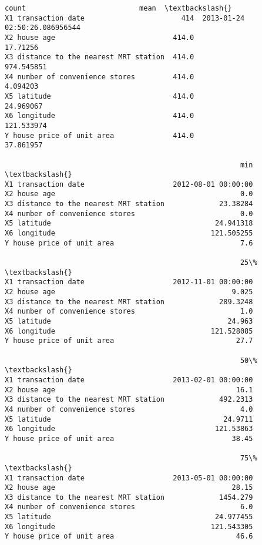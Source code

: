 \documentclass[11pt]{article}
\makeatletter
\newcommand{\boxspacing}{\kern\kvtcb@left@rule\kern\kvtcb@boxsep}
\newcommand{\prompt}[4]{
        {\ttfamily\llap{{\color{#2}[#3]:\hspace{3pt}#4}}\vspace{-\baselineskip}}
    }
\makeatother
\begin{document}
            \begin{tcolorbox}[breakable, size=fbox, boxrule=.5pt, pad at break*=1mm, opacityfill=0]
\prompt{Out}{outcolor}{221}{\boxspacing}
\begin{Verbatim}[commandchars=\\\{\}]
                                        count                           mean  \textbackslash{}
X1 transaction date                       414  2013-01-24 02:50:26.086956544
X2 house age                            414.0                       17.71256
X3 distance to the nearest MRT station  414.0                     974.545851
X4 number of convenience stores         414.0                       4.094203
X5 latitude                             414.0                      24.969067
X6 longitude                            414.0                     121.533974
Y house price of unit area              414.0                      37.861957

                                                        min  \textbackslash{}
X1 transaction date                     2012-08-01 00:00:00
X2 house age                                            0.0
X3 distance to the nearest MRT station             23.38284
X4 number of convenience stores                         0.0
X5 latitude                                       24.941318
X6 longitude                                     121.505255
Y house price of unit area                              7.6

                                                        25\%  \textbackslash{}
X1 transaction date                     2012-11-01 00:00:00
X2 house age                                          9.025
X3 distance to the nearest MRT station             289.3248
X4 number of convenience stores                         1.0
X5 latitude                                          24.963
X6 longitude                                     121.528085
Y house price of unit area                             27.7

                                                        50\%  \textbackslash{}
X1 transaction date                     2013-02-01 00:00:00
X2 house age                                           16.1
X3 distance to the nearest MRT station             492.2313
X4 number of convenience stores                         4.0
X5 latitude                                         24.9711
X6 longitude                                      121.53863
Y house price of unit area                            38.45

                                                        75\%  \textbackslash{}
X1 transaction date                     2013-05-01 00:00:00
X2 house age                                          28.15
X3 distance to the nearest MRT station             1454.279
X4 number of convenience stores                         6.0
X5 latitude                                       24.977455
X6 longitude                                     121.543305
Y house price of unit area                             46.6


\end{Verbatim}
\end{tcolorbox}
\end{document}
